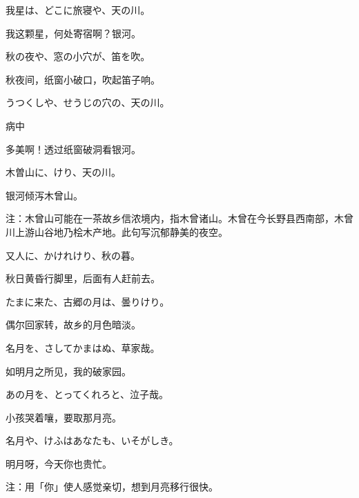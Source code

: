 \begin{haiku}
    {\FH 我星は、どこに旅寝や、天の川。}

    {\FK 我这颗星，何处寄宿啊？银河。}
\end{haiku}

\begin{haiku}
    {\FH 秋の夜や、窓の小穴が、笛を吹。}

    {\FK 秋夜间，纸窗小破口，吹起笛子响。}
\end{haiku}

\begin{haiku}
    {\FH うつくしや、せうじの穴の、天の川。}

    {\FK 病中}

    {\FK 多美啊！透过纸窗破洞看银河。}
\end{haiku}

\begin{haiku}
    {\FH 木曽山に、けり、天の川。}

    {\FK 银河倾泻木曾山。}

    {\FT 注：木曾山可能在一茶故乡信浓境内，指木曾诸山。木曾在今长野县西南部，木曾川上游山谷地乃桧木产地。此句写沉郁静美的夜空。}
\end{haiku}

\begin{haiku}
    {\FH 又人に、かけれけり、秋の暮。}

    {\FK 秋日黄昏行脚里，后面有人赶前去。}
\end{haiku}

\begin{haiku}
    {\FH たまに来た、古郷の月は、曇りけり。}

    {\FK 偶尔回家转，故乡的月色暗淡。}
\end{haiku}

\begin{haiku}
    {\FH 名月を、さしてかまはぬ、草家哉。}

    {\FK 如明月之所见，我的破家园。}
\end{haiku}

\begin{haiku}
    {\FH あの月を、とってくれろと、泣子哉。}

    {\FK 小孩哭着嚷，要取那月亮。}
\end{haiku}

\begin{haiku}
    {\FH 名月や、けふはあなたも、いそがしき。}

    {\FK 明月呀，今天你也贵忙。}

    {\FT 注：用「你」使人感觉亲切，想到月亮移行很快。}
\end{haiku}

